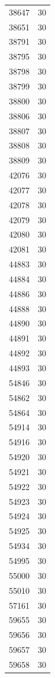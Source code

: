 \begin{table}[ht]
\begin{tabular}{lr}
  38647 &  30 \\ 
  38651 &  30 \\ 
  38791 &  30 \\ 
  38795 &  30 \\ 
  38798 &  30 \\ 
  38799 &  30 \\ 
  38800 &  30 \\ 
  38806 &  30 \\ 
  38807 &  30 \\ 
  38808 &  30 \\ 
  38809 &  30 \\ 
  42076 &  30 \\ 
  42077 &  30 \\ 
  42078 &  30 \\ 
  42079 &  30 \\ 
  42080 &  30 \\ 
  42081 &  30 \\ 
  44883 &  30 \\ 
  44884 &  30 \\ 
  44886 &  30 \\ 
  44888 &  30 \\ 
  44890 &  30 \\ 
  44891 &  30 \\ 
  44892 &  30 \\ 
  44893 &  30 \\ 
  54846 &  30 \\ 
  54862 &  30 \\ 
  54864 &  30 \\ 
  54914 &  30 \\ 
  54916 &  30 \\ 
  54920 &  30 \\ 
  54921 &  30 \\ 
  54922 &  30 \\ 
  54923 &  30 \\ 
  54924 &  30 \\ 
  54925 &  30 \\ 
  54934 &  30 \\ 
  54995 &  30 \\ 
  55000 &  30 \\ 
  55010 &  30 \\ 
  57161 &  30 \\ 
  59655 &  30 \\ 
  59656 &  30 \\ 
  59657 &  30 \\ 
  59658 &  30 \\ 

\end{tabular}
\end{table}
